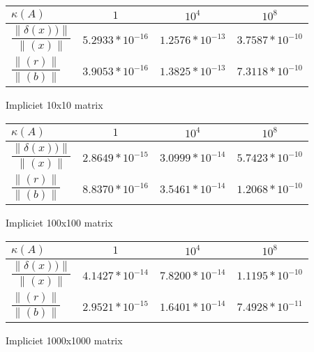 \begin{tabular}{|l|c|c|c|}
\hline
$\kappa(A)$ & $1$ & $10^4$ & $10^8$ \\ \hline
$\dfrac{\|\delta(x))\|}{\|(x)\|}  $ & $5.2933*10^{-16}$ & $1.2576*10^{-13}$ & $3.7587*10^{-10}$ \\ \hline
$\dfrac{\|(r)\|}{\|(b)\|}$ & $3.9053*10^{-16}$ & $1.3825*10^{-13}$ & $7.3118*10^{-10}$ \\ \hline
\end{tabular}
\caption{Impliciet 10x10 matrix}

\begin{tabular}{|l|c|c|c|}
\hline
$\kappa(A)$ & $1$ & $10^4$ & $10^8$ \\ \hline
$\dfrac{\|\delta(x))\|}{\|(x)\|}  $ & $2.8649*10^{-15}$ & $3.0999*10^{-14}$ & $5.7423*10^{-10}$ \\ \hline
$\dfrac{\|(r)\|}{\|(b)\|}$ & $8.8370*10^{-16}$ & $3.5461*10^{-14}$ & $1.2068*10^{-10}$ \\ \hline
\end{tabular}
\caption{Impliciet 100x100 matrix}

\begin{tabular}{|l|c|c|c|}
\hline
$\kappa(A)$ & $1$ & $10^4$ & $10^8$ \\ \hline
$\dfrac{\|\delta(x))\|}{\|(x)\|}  $ & $4.1427*10^{-14}$ & $7.8200*10^{-14}$ & $1.1195*10^{-10}$ \\ \hline
$\dfrac{\|(r)\|}{\|(b)\|}$ & $ 2.9521*10^{-15}$ & $1.6401*10^{-14}$ & $7.4928*10^{-11}$ \\ \hline
\end{tabular}
\caption{Impliciet 1000x1000 matrix}